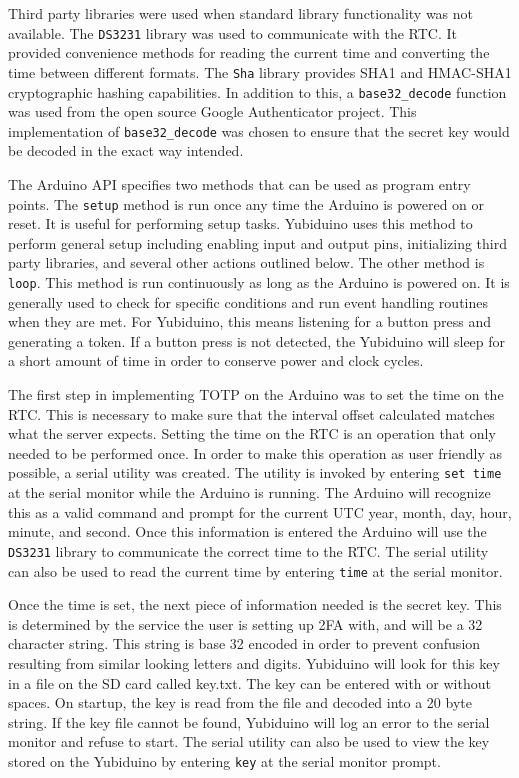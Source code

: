 \documentclass[conference]{IEEEtran}
\begin{document}
Third party libraries were used when standard library functionality was not
available.  The \texttt{DS3231} library was used to communicate with the RTC.
It provided convenience methods for reading the current time and converting the
time between different formats.  The \texttt{Sha} library provides SHA1 and
HMAC-SHA1 cryptographic hashing capabilities.  In addition to this, a
\texttt{base32\_decode} function was used from the open source Google
Authenticator project.  This implementation of \texttt{base32\_decode} was
chosen to ensure that the secret key would be decoded in the exact way
intended.

The Arduino API specifies two methods that can be used as program entry points.
The \texttt{setup} method is run once any time the Arduino is powered on or
reset.  It is useful for performing setup tasks.  Yubiduino uses this method to
perform general setup including enabling input and output pins, initializing
third party libraries, and several other actions outlined below.  The other
method is \texttt{loop}.  This method is run continuously as long as the
Arduino is powered on.  It is generally used to check for specific conditions
and run event handling routines when they are met.  For Yubiduino, this means
listening for a button press and generating a token.  If a button press is not
detected, the Yubiduino will sleep for a short amount of time in order to
conserve power and clock cycles.

The first step in implementing TOTP on the Arduino was to set the time on the
RTC.  This is necessary to make sure that the interval offset calculated
matches what the server expects.  Setting the time on the RTC is an operation
that only needed to be performed once.  In order to make this operation as user
friendly as possible, a serial utility was created.  The utility is invoked by
entering \texttt{set time} at the serial monitor while the Arduino is running.
The Arduino will recognize this as a valid command and prompt for the current
UTC year, month, day, hour, minute, and second.  Once this information is
entered the Arduino will use the \texttt{DS3231} library to communicate the
correct time to the RTC.  The serial utility can also be used to read the
current time by entering \texttt{time} at the serial monitor.

Once the time is set, the next piece of information needed is the secret key.
This is determined by the service the user is setting up 2FA with, and will be
a 32 character string.  This string is base 32 encoded in order to prevent
confusion resulting from similar looking letters and digits.  Yubiduino will
look for this key in a file on the SD card called key.txt.  The key can be
entered with or without spaces.  On startup, the key is read from the file and
decoded into a 20 byte string.  If the key file cannot be found, Yubiduino will
log an error to the serial monitor and refuse to start.  The serial utility can
also be used to view the key stored on the Yubiduino by entering \texttt{key}
at the serial monitor prompt.
\end{document}
